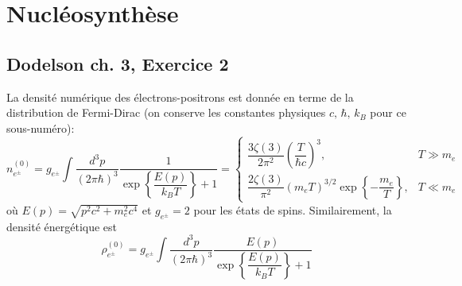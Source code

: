 \documentclass{article}
\numberwithin{equation}{section}
\begin{document}
\section{Nucléosynthèse}
\subsection{Dodelson ch. 3, Exercice 2}
La densité numérique des électrons-positrons est donnée en terme de la distribution 
de Fermi-Dirac (on conserve les constantes physiques $c,\, \hbar,\, k_B$ pour ce 
sous-numéro):
\begin{equation}\label{eq:nelectron} 
        n_{e^\pm}^{(0)} = g_{e^\pm}\int \frac{d^3p}{(2 \pi \hbar)^{3}} 
        \frac{1}{\exp \left\{ \dfrac{E(p)}{k_B T} \right\} + 1} 
        = \left\{ 
\begin{array}{ll}
        \dfrac{3 \zeta(3)}{2\pi^2}\left(\dfrac{T}{\hbar c}  \right)^3, & T \gg m_e \\[3ex]
        \dfrac{2\zeta(3)}{\pi^2}\left( m_e T \right)^{3/2} \exp \left\{ -\dfrac{m_e}{T} \right\}, & T \ll m_e
        
\end{array}
        \right.
\end{equation} 
où $E(p) = \sqrt{p^2 c^2 + m_e^2c^4}$ et $g_{e^\pm} = 2$ pour les états de spins. 
Similairement, la densité énergétique est
\begin{equation}\label{eq:nelectron} 
        \rho_{e^\pm}^{(0)} = g_{e^\pm}\int \frac{d^3p}{(2 \pi \hbar)^{3}} 
        \frac{E(p)}{\exp \left\{ \dfrac{E(p)}{k_B T} \right\} + 1} 
\end{equation} 
        
\end{document}
